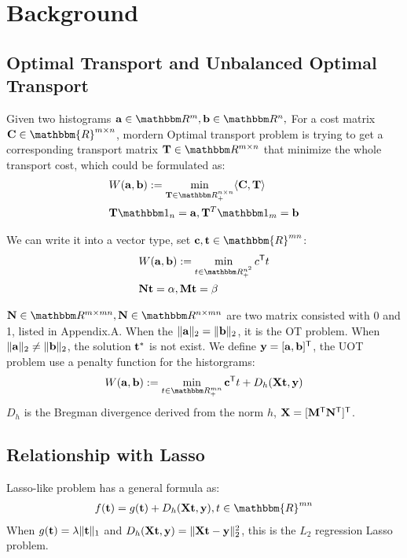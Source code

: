 \section{Background}
\subsection{Optimal Transport and Unbalanced Optimal Transport}
Given two histograms $\ma\in \R^{m}, \mb \in \R^{n},$ For a cost matrix $\C \in \mathbbm{R}^{m \times n}$, mordern Optimal transport problem is trying to get a corresponding transport matrix $\T \in \R^{m \times n}$ that minimize the whole transport cost, which could be formulated as:
$$
\begin{aligned}
&W(\ma,\mb) := \min_{ \T \in \R_{+}^{n \times n}} \langle \C, \T \rangle \\
& \mathbf{T} \one_n= \ma, \mathbf{T}^{T}\one_m = \mb
\end{aligned}
$$

We can write it into a vector type, set $\vc,\vt \in \mathbbm{R}^{mn}$:
$$
\begin{aligned}
&W(\ma,\mb) := \min_{t \in \R_{+}^{n^2}} c^{\tranT}t \\
& \mathbf{N}\vt = \alpha, \mathbf{M}\vt = \beta
\end{aligned}
$$

$\mathbf{N} \in \R^{m \times mn}, \mathbf{N} \in \R^{n \times mn}$ are two matrix consisted with 0 and 1, listed in Appendix.A. When the $\|\mathbf{a}\|_2 = \|\mathbf{b}\|_2$, it is the OT problem. When $\|\mathbf{a}\|_2 \neq \|\mathbf{b}\|_2$, the solution $\mathbf t^{*}$ is not exist. We define $\mathbf y = [\mathbf{a}, \mathbf{b}]^{\mathsf T}$, the UOT problem use a penalty function for the historgrams: 
\begin{equation}
\label{eq:uot}
W(\ma,\mb) := \min_{t \in \R_{+}^{mn}} \vc^{\tranT}t + D_h(\X\vt,\y)
\end{equation}
$D_h$ is the Bregman divergence derived from the norm $h$, $\mathbf{X} = [\mathbf{M}^{\mathsf T} \mathbf{N}^{\mathsf T}]^{\mathsf T}$.

\subsection{Relationship with Lasso}
Lasso-like problem has a general formula as:
$$
\begin{aligned}
f(\vt) = g(\vt) + D_h(\X \vt,\y), t\in \mathbbm{R}^{mn}
\end{aligned}
$$
When $g(\mathbf t) = \lambda \|\mathbf t\|_1$ and $D_h(\mathbf{X} \mathbf t,\mathbf y) = \|\mathbf{X} \mathbf t-\mathbf y\|_2^2$, this is the $L_2$ regression Lasso problem.


